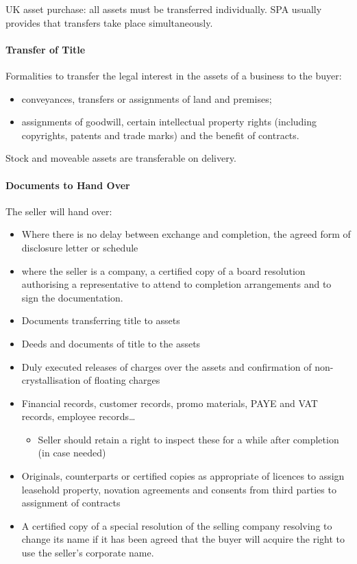 \documentclass[
]{article}
\providecommand{\tightlist}{%
  \setlength{\itemsep}{0pt}\setlength{\parskip}{0pt}}
\begin{document}
UK asset purchase: all assets must be transferred individually. SPA
usually provides that transfers take place simultaneously.

\hypertarget{transfer-of-title}{%
\paragraph{Transfer of Title}\label{transfer-of-title}}

Formalities to transfer the legal interest in the assets of a business
to the buyer:

\begin{itemize}
\tightlist
\item
  conveyances, transfers or assignments of land and premises;
\item
  assignments of goodwill, certain intellectual property rights
  (including copyrights, patents and trade marks) and the benefit of
  contracts.
\end{itemize}

Stock and moveable assets are transferable on delivery.

\hypertarget{documents-to-hand-over}{%
\paragraph{Documents to Hand Over}\label{documents-to-hand-over}}

The seller will hand over:

\begin{itemize}
\tightlist
\item
  Where there is no delay between exchange and completion, the agreed
  form of disclosure letter or schedule
\item
  where the seller is a company, a certified copy of a board resolution
  authorising a representative to attend to completion arrangements and
  to sign the documentation.
\item
  Documents transferring title to assets
\item
  Deeds and documents of title to the assets
\item
  Duly executed releases of charges over the assets and confirmation of
  non-crystallisation of floating charges
\item
  Financial records, customer records, promo materials, PAYE and VAT
  records, employee records\ldots{}

  \begin{itemize}
  \tightlist
  \item
    Seller should retain a right to inspect these for a while after
    completion (in case needed)
  \end{itemize}
\item
  Originals, counterparts or certified copies as appropriate of licences
  to assign leasehold property, novation agreements and consents from
  third parties to assignment of contracts
\item
  A certified copy of a special resolution of the selling company
  resolving to change its name if it has been agreed that the buyer will
  acquire the right to use the seller's corporate name.
\end{itemize}
\end{document}
